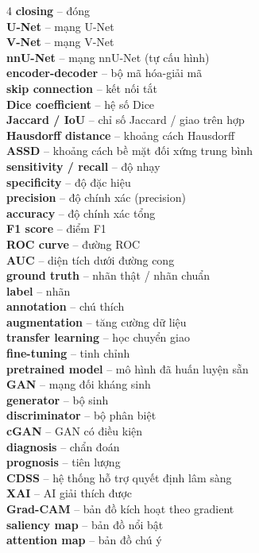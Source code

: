 \begin{multicols}{4}
\textbf{closing} -- đóng\\
\textbf{U-Net} -- mạng U-Net\\
\textbf{V-Net} -- mạng V-Net\\
\textbf{nnU-Net} -- mạng nnU-Net (tự cấu hình)\\
\textbf{encoder-decoder} -- bộ mã hóa-giải mã\\
\textbf{skip connection} -- kết nối tắt\\
\textbf{Dice coefficient} -- hệ số Dice\\
\textbf{Jaccard / IoU} -- chỉ số Jaccard / giao trên hợp\\
\textbf{Hausdorff distance} -- khoảng cách Hausdorff\\
\textbf{ASSD} -- khoảng cách bề mặt đối xứng trung bình\\
\textbf{sensitivity / recall} -- độ nhạy\\
\textbf{specificity} -- độ đặc hiệu\\
\textbf{precision} -- độ chính xác (precision)\\
\textbf{accuracy} -- độ chính xác tổng\\
\textbf{F1 score} -- điểm F1\\
\textbf{ROC curve} -- đường ROC\\
\textbf{AUC} -- diện tích dưới đường cong\\
\textbf{ground truth} -- nhãn thật / nhãn chuẩn\\
\textbf{label} -- nhãn\\
\textbf{annotation} -- chú thích\\
\textbf{augmentation} -- tăng cường dữ liệu\\
\textbf{transfer learning} -- học chuyển giao\\
\textbf{fine-tuning} -- tinh chỉnh\\
\textbf{pretrained model} -- mô hình đã huấn luyện sẵn\\
\textbf{GAN} -- mạng đối kháng sinh\\
\textbf{generator} -- bộ sinh\\
\textbf{discriminator} -- bộ phân biệt\\
\textbf{cGAN} -- GAN có điều kiện\\
\textbf{diagnosis} -- chẩn đoán\\
\textbf{prognosis} -- tiên lượng\\
\textbf{CDSS} -- hệ thống hỗ trợ quyết định lâm sàng\\
\textbf{XAI} -- AI giải thích được\\
\textbf{Grad-CAM} -- bản đồ kích hoạt theo gradient\\
\textbf{saliency map} -- bản đồ nổi bật\\
\textbf{attention map} -- bản đồ chú ý\\


\end{multicols}

